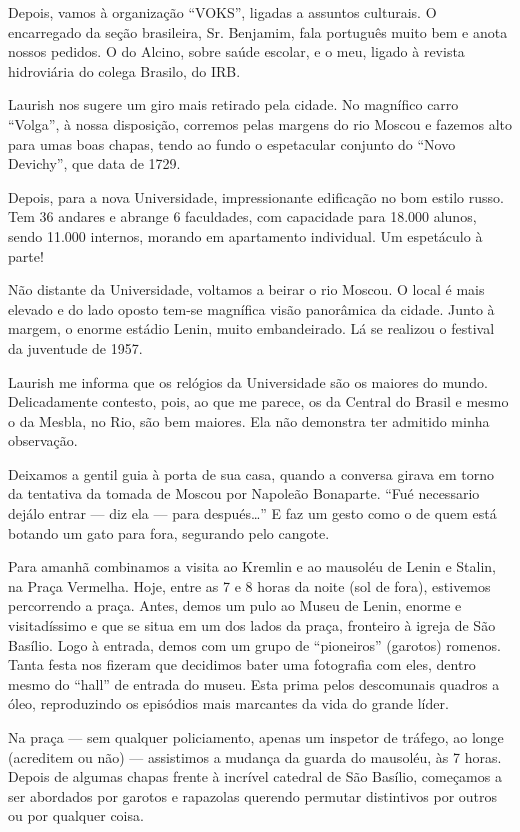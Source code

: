 Depois, vamos à organização ``VOKS'', ligadas a assuntos culturais. O encarregado da seção brasileira, Sr. Benjamim, fala português muito bem e anota nossos pedidos. O do Alcino, sobre saúde escolar, e o meu, ligado à revista hidroviária do colega Brasilo, do IRB.

Laurish nos sugere um giro mais retirado pela cidade. No magnífico carro ``Volga'', à nossa disposição, corremos pelas margens do rio Moscou e fazemos alto para umas boas chapas, tendo ao fundo o espetacular conjunto do ``Novo Devichy'', que data de 1729.

Depois, para a nova Universidade, impressionante edificação no bom estilo russo. Tem 36 andares e abrange 6 faculdades, com capacidade para 18.000 alunos, sendo 11.000 internos, morando em apartamento individual. Um espetáculo à parte!

Não distante da Universidade, voltamos a beirar o rio Moscou. O local é mais elevado e do lado oposto tem-se magnífica visão panorâmica da cidade. Junto à margem, o enorme estádio Lenin, muito embandeirado. Lá se realizou o festival da juventude de 1957.

Laurish me informa que os relógios da Universidade são os maiores do mundo. Delicadamente contesto, pois, ao que me parece, os da Central do Brasil e mesmo o da Mesbla, no Rio, são bem maiores. Ela não demonstra ter admitido minha observação.

Deixamos a gentil guia à porta de sua casa, quando a conversa girava em torno da tentativa da tomada de Moscou por Napoleão Bonaparte. ``Fué necessario dejálo entrar --- diz ela --- para después\ldots'' E faz um gesto como o de quem está botando um gato para fora, segurando pelo cangote.

Para amanhã combinamos a visita ao Kremlin e ao mausoléu de Lenin e Stalin, na Praça Vermelha. Hoje, entre as 7 e 8 horas da noite (sol de fora), estivemos percorrendo a praça. Antes, demos um pulo ao Museu de Lenin, enorme e visitadíssimo e que se situa em um dos lados da praça, fronteiro à igreja de São Basílio. Logo à entrada, demos com um grupo de ``pioneiros'' (garotos) romenos. Tanta festa nos fizeram que decidimos bater uma fotografia com eles, dentro mesmo do ``hall'' de entrada do museu. Esta prima pelos descomunais quadros a óleo, reproduzindo os episódios mais marcantes da vida do grande líder.

Na praça --- sem qualquer policiamento, apenas um inspetor de tráfego, ao longe (acreditem ou não) --- assistimos a mudança da guarda do mausoléu, às 7 horas. Depois de algumas chapas frente à incrível catedral de São Basílio, começamos a ser abordados por garotos e rapazolas querendo permutar distintivos por outros ou por qualquer coisa.

